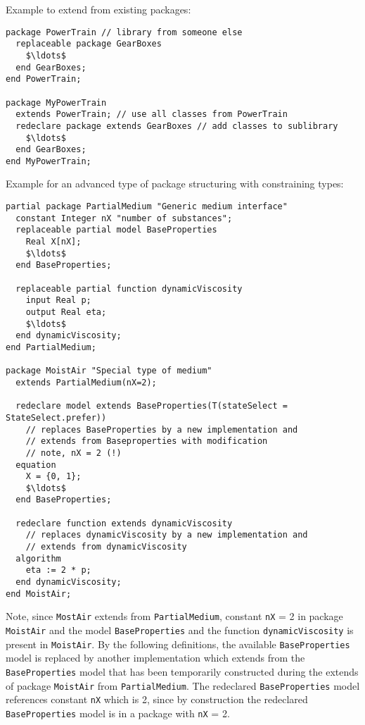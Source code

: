 \begin{nonnormative}
Example to extend from existing packages:
\begin{lstlisting}[language=modelica]
package PowerTrain // library from someone else
  replaceable package GearBoxes
    $\ldots$
  end GearBoxes;
end PowerTrain;

package MyPowerTrain
  extends PowerTrain; // use all classes from PowerTrain
  redeclare package extends GearBoxes // add classes to sublibrary
    $\ldots$
  end GearBoxes;
end MyPowerTrain;
\end{lstlisting}

Example for an advanced type of package structuring with constraining types:
\begin{lstlisting}[language=modelica]
partial package PartialMedium "Generic medium interface"
  constant Integer nX "number of substances";
  replaceable partial model BaseProperties
    Real X[nX];
    $\ldots$
  end BaseProperties;

  replaceable partial function dynamicViscosity
    input Real p;
    output Real eta;
    $\ldots$
  end dynamicViscosity;
end PartialMedium;

package MoistAir "Special type of medium"
  extends PartialMedium(nX=2);

  redeclare model extends BaseProperties(T(stateSelect = StateSelect.prefer))
    // replaces BaseProperties by a new implementation and
    // extends from Baseproperties with modification
    // note, nX = 2 (!)
  equation
    X = {0, 1};
    $\ldots$
  end BaseProperties;

  redeclare function extends dynamicViscosity
    // replaces dynamicViscosity by a new implementation and
    // extends from dynamicViscosity
  algorithm
    eta := 2 * p;
  end dynamicViscosity;
end MoistAir;
\end{lstlisting}

Note, since \lstinline!MostAir! extends from \lstinline!PartialMedium!, constant \lstinline!nX! = 2 in package \lstinline!MoistAir! and the model \lstinline!BaseProperties! and the function \lstinline!dynamicViscosity! is present in \lstinline!MoistAir!.
By the following definitions, the available \lstinline!BaseProperties! model is replaced by another implementation which extends from the \lstinline!BaseProperties! model that has been temporarily constructed during the extends of package \lstinline!MoistAir! from \lstinline!PartialMedium!.
The redeclared \lstinline!BaseProperties! model references constant \lstinline!nX! which is 2, since by construction the redeclared \lstinline!BaseProperties! model is in a package with \lstinline!nX! = 2.


\end{nonnormative}
